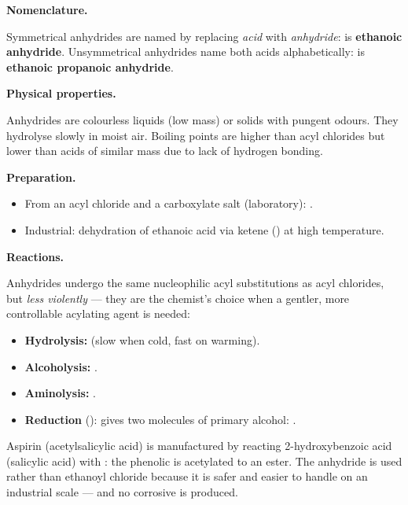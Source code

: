 \documentclass[11pt]{article}
\begin{document}
\textbf{Nomenclature.}\par
Symmetrical anhydrides are named by replacing \emph{acid} with \emph{anhydride}:  is \textbf{ethanoic anhydride}. Unsymmetrical anhydrides name both acids alphabetically:  is \textbf{ethanoic propanoic anhydride}.

\textbf{Physical properties.}\par
Anhydrides are colourless liquids (low mass) or solids with pungent odours. They hydrolyse slowly in moist air. Boiling points are higher than acyl chlorides but lower than acids of similar mass due to lack of hydrogen bonding.

\textbf{Preparation.}\par
\begin{itemize}
\item From an acyl chloride and a carboxylate salt (laboratory): .
\item Industrial: dehydration of ethanoic acid via ketene () at high temperature.
\end{itemize}

\textbf{Reactions.}\par
Anhydrides undergo the same nucleophilic acyl substitutions as acyl chlorides, but \emph{less violently} — they are the chemist's choice when a gentler, more controllable acylating agent is needed:
\begin{itemize}
\item \textbf{Hydrolysis:}  (slow when cold, fast on warming).
\item \textbf{Alcoholysis:} .
\item \textbf{Aminolysis:} .
\item \textbf{Reduction} (): gives two molecules of primary alcohol: .
\end{itemize}

\begin{savaistu}
Aspirin (acetylsalicylic acid) is manufactured by reacting 2-hydroxybenzoic acid (salicylic acid) with : the phenolic  is acetylated to an ester. The anhydride is used rather than ethanoyl chloride because it is safer and easier to handle on an industrial scale — and no corrosive  is produced.
\end{savaistu}
\end{document}
